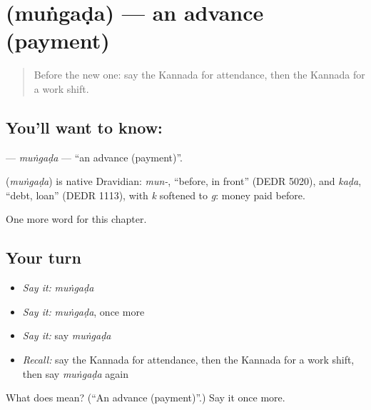 \section[\texorpdfstring{\kn{ಮುಂಗಡ} (muṅgaḍa)}{ಮುಂಗಡ (muṅgaḍa)}]{ (muṅgaḍa) — an advance (payment)}

\label{lesson:KA-C234-mungada}



\begin{quote}
Before the new one: say the Kannada for attendance, then the Kannada for a work shift.
\end{quote}

\subsection*{You'll want to know: }
\textbf{} — \emph{muṅgaḍa} — \textquotedblleft{}an advance (payment)\textquotedblright{}.

\begin{cousinweb}
\textbf{} (\emph{muṅgaḍa}) is native Dravidian: \emph{mun-}, \textquotedblleft{}before, in front\textquotedblright{} (DEDR 5020), and \emph{kaḍa}, \textquotedblleft{}debt, loan\textquotedblright{} (DEDR 1113), with \emph{k} softened to \emph{g}: money paid before.
\end{cousinweb}

\begin{grammarlens}[title={What you've built}]
One more word for this chapter.
\end{grammarlens}

\subsection*{Your turn}
\begin{itemize}
\raggedright
  \item \emph{Say it:} \emph{muṅgaḍa}
  \item \emph{Say it:} \emph{muṅgaḍa}, once more
  \item \emph{Say it:} say \emph{muṅgaḍa}
  \item \emph{Recall:} say the Kannada for attendance, then the Kannada for a work shift, then say \emph{muṅgaḍa} again
\end{itemize}

\begin{tcolorbox}[breakable,colback=teal!4,colframe=teal!35!black,title={Before you move on}]
What does  mean? (\textquotedblleft{}An advance (payment)\textquotedblright{}.) Say it once more.
\end{tcolorbox}
